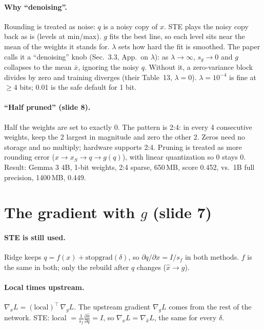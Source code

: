 \documentclass[11pt]{article}
\begin{document}
\paragraph{Why ``denoising''.} Rounding is treated as noise: $q$ is a noisy copy of $x$. STE plays the noisy copy back as is (levels at min/max). $g$ fits the best line, so each level sits near the mean of the weights it stands for. $\lambda$ sets how hard the fit is smoothed. The paper calls it a ``denoising'' knob (Sec.~3.3, App.~on $\lambda$): as $\lambda\to\infty$, $s_g\to0$ and $g$ collapses to the mean $\bar x$, ignoring the noisy $q$. Without it, a zero-variance block divides by zero and training diverges (their Table~13, $\lambda=0$). $\lambda=10^{-4}$ is fine at $\ge4$ bits; 0.01 is the safe default for 1 bit.

\paragraph{``Half pruned'' (slide 8).} Half the weights are set to exactly 0. The pattern is 2:4: in every 4 consecutive weights, keep the 2 largest in magnitude and zero the other 2. Zeros need no storage and no multiply; hardware supports 2:4. Pruning is treated as more rounding error ($x\to x_S\to q\to g(q)$), with linear quantization so 0 stays 0. Result: Gemma 3 4B, 1-bit weights, 2:4 sparse, 650\,MB, score 0.452, vs.\ 1B full precision, 1400\,MB, 0.449.

\section{The gradient with $g$ (slide 7)}

\paragraph{STE is still used.} Ridge keeps $q=f(x)+\mathrm{stopgrad}(\delta)$, so $\partial q/\partial x=I/s_f$ in both methods. $f$ is the same in both; only the rebuild after $q$ changes ($\hat x\to g$).

\paragraph{Local times upstream.} $\nabla_xL=(\text{local})^\top\,\nabla_gL$. The upstream gradient $\nabla_gL$ comes from the rest of the network.
STE: local $=\frac1{s_f}\frac{\partial\hat x}{\partial q}=I$, so $\nabla_xL=\nabla_{\hat x}L$, the same for every $\delta$.
\end{document}

